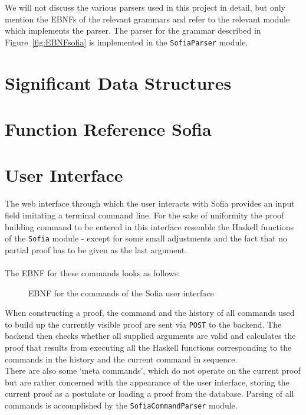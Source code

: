 \documentclass[notitlepage]{report}
\newcommand\m[1]{\texttt{#1}}
\begin{document}
We will not discuss the various parsers used in this project in detail, but only
mention the EBNFs of the relevant grammars and refer to the relevant module
which implements the parser. The parser for the grammar described in
Figure~\ref{fig:EBNFsofia} is implemented in the \m{SofiaParser} module.

\chapter{Significant Data Structures}


\chapter{Function Reference Sofia}


\chapter{User Interface}
The web interface through which the user interacts with Sofia provides an input
field imitating a terminal command line. For the sake of uniformity the proof
building command to be entered in this interface resemble the Haskell functions
of the \m{Sofia} module - except for some small adjustments and the fact that no
partial proof has to be given as the last argument.
\\\\
The EBNF for these commands looks as follows:
\begin{figure}[h!]
    {\renewcommand{\arraystretch}{2.0}
    }
    \caption{EBNF for the commands of the Sofia
             user interface}\label{fig:EBNFcmds}
\end{figure}

When constructing a proof, the command and the history of all commands used to
build up the currently visible proof are sent via \texttt{POST} to the backend.
The backend then checks whether all supplied arguments are valid and calculates
the proof that results from executing all the Haskell functions corresponding to
the commands in the history and the current command in sequence.
\\
There are also some `meta commands', which do not operate on the current proof
but are rather concerned with the appearance of the user interface, storing the
current proof as a postulate or loading a proof from the database. Parsing of
all commands is accomplished by the \m{SofiaCommandParser} module.
\end{document}
